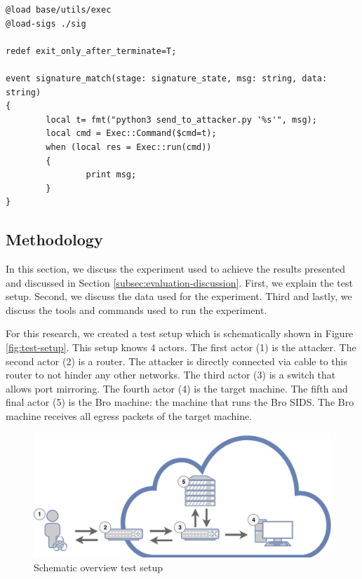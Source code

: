   
\begin{lstlisting}[caption={Bro script which executes whenever signature match occurs}, label={lst:bro-script}]
@load base/utils/exec
@load-sigs ./sig

redef exit_only_after_terminate=T;

event signature_match(stage: signature_state, msg: string, data: string)
{
        local t= fmt("python3 send_to_attacker.py '%s'", msg);
        local cmd = Exec::Command($cmd=t);
        when (local res = Exec::run(cmd))
        {
                print msg;
        }
}
\end{lstlisting} 





\subsection{Methodology}\label{subsec:methodology}
In this section, we discuss the experiment used to achieve the results presented and discussed in Section \ref{subsec:evaluation-discussion}. First, we explain the test setup. Second, we discuss the data used for the experiment. Third and lastly, we discuss the tools and commands used to run the experiment. 

For this research, we created a test setup which is schematically shown in Figure \ref{fig:test-setup}. This setup knows 4 actors. The first actor (1) is the attacker. The second actor (2) is a router. The attacker is directly connected via cable to this router to not hinder any other networks. The third actor (3) is a switch that allows port mirroring. The fourth actor (4) is the target machine. The fifth and final actor (5) is the Bro machine: the machine that runs the Bro SIDS. The Bro machine receives all egress packets of the target machine. 


\begin{figure}[H]
\centering
\includegraphics[width=\textwidth]{./images/test-setup.pdf}
\caption{Schematic overview test setup}
\end{figure}\label{fig:test-setup}

